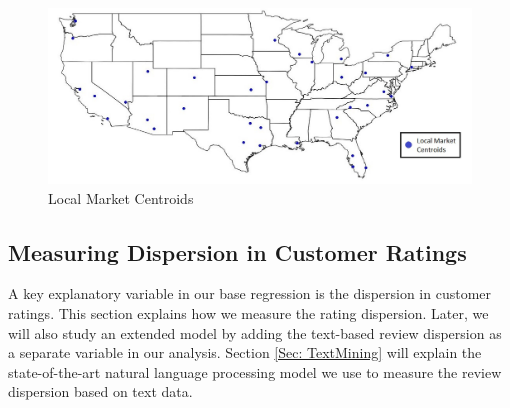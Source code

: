\documentclass[msom,blindrev]{informs3}
\begin{document}





%
%
%
%
%
\begin{figure}
	\centering
	\includegraphics[width=1\linewidth]{markets.jpg}
	\caption{Local Market Centroids}
	\label{fig: markets}
\end{figure}

\subsection{Measuring Dispersion in Customer Ratings} \label{Subsec: Measure Dispersion}

A key explanatory variable in our base regression is the dispersion in customer ratings. This section explains how we measure the rating dispersion. Later, we will also study an extended model by adding the text-based review dispersion as a separate variable in our analysis.  Section \ref{Sec: TextMining} will explain the state-of-the-art natural language processing model we use to measure the review dispersion based on text data.

\end{document}
